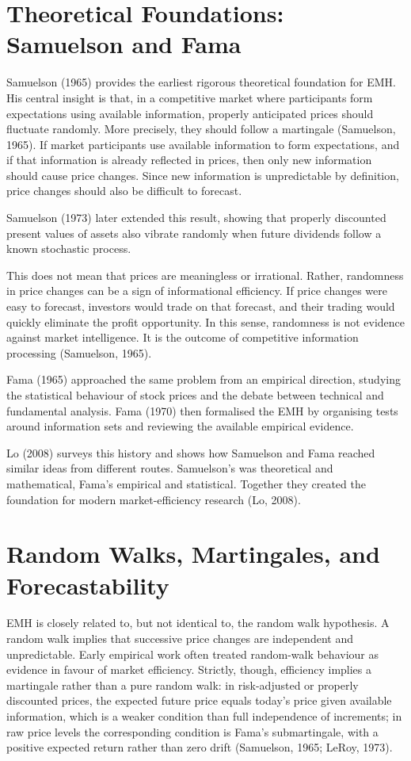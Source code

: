 \documentclass[11pt,a4paper]{article}
\begin{document}
\section{Theoretical Foundations: Samuelson and Fama}

Samuelson (1965) provides the earliest rigorous theoretical foundation for EMH. His central insight is that, in a competitive market where participants form expectations using available information, properly anticipated prices should fluctuate randomly. More precisely, they should follow a martingale (Samuelson, 1965). If market participants use available information to form expectations, and if that information is already reflected in prices, then only new information should cause price changes. Since new information is unpredictable by definition, price changes should also be difficult to forecast.

Samuelson (1973) later extended this result, showing that properly discounted present values of assets also vibrate randomly when future dividends follow a known stochastic process.

This does not mean that prices are meaningless or irrational. Rather, randomness in price changes can be a sign of informational efficiency. If price changes were easy to forecast, investors would trade on that forecast, and their trading would quickly eliminate the profit opportunity. In this sense, randomness is not evidence against market intelligence. It is the outcome of competitive information processing (Samuelson, 1965).

Fama (1965) approached the same problem from an empirical direction, studying the statistical behaviour of stock prices and the debate between technical and fundamental analysis. Fama (1970) then formalised the EMH by organising tests around information sets and reviewing the available empirical evidence.

Lo (2008) surveys this history and shows how Samuelson and Fama reached similar ideas from different routes. Samuelson's was theoretical and mathematical, Fama's empirical and statistical. Together they created the foundation for modern market-efficiency research (Lo, 2008).

\section{Random Walks, Martingales, and Forecastability}

EMH is closely related to, but not identical to, the random walk hypothesis. A random walk implies that successive price changes are independent and unpredictable. Early empirical work often treated random-walk behaviour as evidence in favour of market efficiency. Strictly, though, efficiency implies a martingale rather than a pure random walk: in risk-adjusted or properly discounted prices, the expected future price equals today's price given available information, which is a weaker condition than full independence of increments; in raw price levels the corresponding condition is Fama's submartingale, with a positive expected return rather than zero drift (Samuelson, 1965; LeRoy, 1973).
\end{document}

